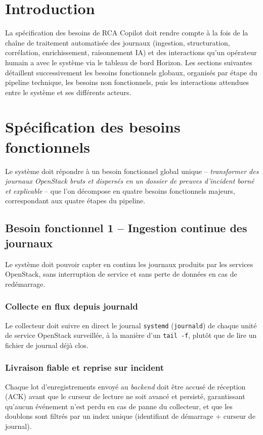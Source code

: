 \documentclass[a4paper,11pt,oneside]{report}
\begin{document}
\section{Introduction}
La spécification des besoins de RCA Copilot doit rendre compte à la fois de la chaîne de traitement automatisée des journaux (ingestion, structuration, corrélation, enrichissement, raisonnement IA) et des interactions qu'un opérateur humain a avec le système via le tableau de bord Horizon. Les sections suivantes détaillent successivement les besoins fonctionnels globaux, organisés par étape du pipeline technique, les besoins non fonctionnels, puis les interactions attendues entre le système et ses différents acteurs.

\section{Spécification des besoins fonctionnels}
Le système doit répondre à un besoin fonctionnel global unique -- \emph{transformer des journaux OpenStack bruts et dispersés en un dossier de preuves d'incident borné et explicable} -- que l'on décompose en quatre besoins fonctionnels majeurs, correspondant aux quatre étapes du pipeline.

\subsection{Besoin fonctionnel 1 -- Ingestion continue des journaux}
Le système doit pouvoir capter en continu les journaux produits par les services OpenStack, sans interruption de service et sans perte de données en cas de redémarrage.
\subsubsection{Collecte en flux depuis journald}
Le collecteur doit suivre en direct le journal \texttt{systemd} (\texttt{journald}) de chaque unité de service OpenStack surveillée, à la manière d'un \texttt{tail -f}, plutôt que de lire un fichier de journal déjà clos.
\subsubsection{Livraison fiable et reprise sur incident}
Chaque lot d'enregistrements envoyé au \emph{backend} doit être accusé de réception (ACK) avant que le curseur de lecture ne soit avancé et persisté, garantissant qu'aucun événement n'est perdu en cas de panne du collecteur, et que les doublons sont filtrés par un index unique (identifiant de démarrage + curseur de journal).
\end{document}
